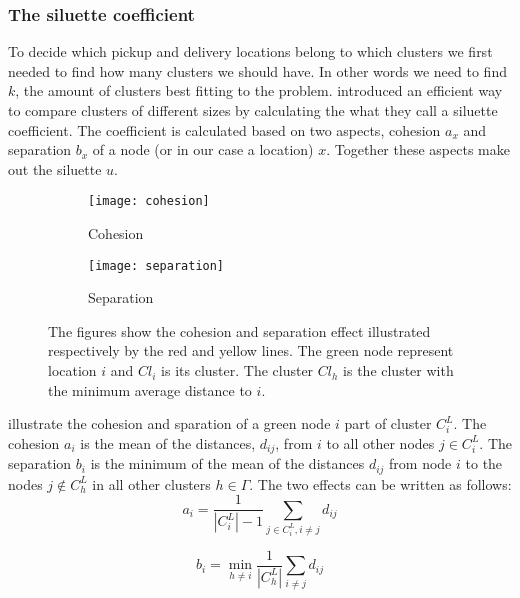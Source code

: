 \documentclass[../main.tex]{subfiles}
\begin{document}
\subsubsection{The siluette coefficient}
To decide which pickup and delivery locations belong to which clusters we first needed to find how many clusters we should have. 
In other words we need to find $k$, the amount of clusters best fitting to the problem. 
\cite{kaufman90} introduced an efficient way to compare clusters of different sizes by calculating the what they call a siluette coefficient.
The coefficient is calculated based on two aspects, cohesion $a_x$ and separation $b_x$ of a node (or in our case a location) $x$. 
Together these aspects make out the siluette $u$.
\begin{figure}
\centering
    \begin{subfigure}[b]{0.35\textwidth}
        \centering
        \texttt{[image: cohesion]}
        \caption{Cohesion}
        \label{fig:cohesion}
    \end{subfigure}
    \hfill
    \begin{subfigure}[b]{0.60\textwidth}
        \centering
        \texttt{[image: separation]}
        \caption{Separation}
        \label{fig:separation}
    \end{subfigure}
    \label{fig:silu}
    \caption{The figures show the cohesion and separation effect illustrated respectively by the red and yellow lines. The green node represent location $i$ and $Cl_i$ is its cluster. The cluster $Cl_h$ is the cluster with the minimum average distance to $i$. }
\end{figure}


 illustrate the cohesion and sparation of a green node $i$ part of cluster $C^L_i$. 
The cohesion $a_i$ is the mean of the distances, $d_{ij}$, from $i$ to all other nodes $j\in C^L_i$. The separation $b_i$ is the minimum of the mean of the distances $d_{ij}$ from node $i$ to the nodes $j\not\in C^L_h$ in all other clusters $h\in \Gamma$.
The two effects can be written as follows:
\begin{equation}
    \label{eq:cohesion}
    a_i = \dfrac{1}{|C^L_i|-1}\sum_{j\in C^L_i, i\neq j}{d_{ij}}
\end{equation}

\begin{equation}
    \label{eq:cohesion}
    b_i = \min_{h\neq i} \dfrac{1}{|C^L_h|}\sum_{i\neq j}{d_{ij}}
\end{equation}
\end{document}
